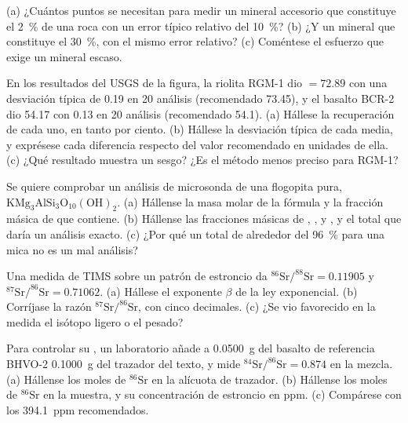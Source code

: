 \begin{exercise}[$\star\star$]\label{exo:b2:field-lab-methods-2:5}
(a) ¿Cuántos puntos se necesitan para medir un mineral accesorio que constituye el \qty{2}{\percent} de una roca
con un error típico relativo del \qty{10}{\percent}? (b) ¿Y un mineral que constituye el \qty{30}{\percent},
con el mismo error relativo? (c) Coméntese el esfuerzo que exige un mineral escaso.
\end{exercise}

\begin{exercise}[$\star\star$]\label{exo:b2:field-lab-methods-2:6}
En los resultados del USGS de la figura, la riolita RGM-1 dio  $= 72.89$ con una desviación
típica de 0.19 en 20 análisis (recomendado 73.45), y el basalto BCR-2 dio 54.17 con 0.13 en
20 análisis (recomendado 54.1). (a) Hállese la recuperación de cada uno, en tanto por ciento. (b) Hállese la desviación
típica de cada media, y exprésese cada diferencia respecto del valor recomendado en unidades de ella.
(c) ¿Qué resultado muestra un sesgo? ¿Es el método menos preciso para RGM-1?
\end{exercise}

\begin{exercise}[$\star\star$]\label{exo:b2:field-lab-methods-2:7}
Se quiere comprobar un análisis de microsonda de una flogopita pura, $\mathrm{KMg_3AlSi_3O_{10}(OH)_2}$.
(a) Hállense la masa molar de la fórmula y la fracción másica de  que contiene. (b) Hállense las
fracciones másicas de , ,  y , y el total que daría un análisis
exacto. (c) ¿Por qué un total de alrededor del \qty{96}{\percent} para una mica no es un mal análisis?
\end{exercise}

\begin{exercise}[$\star\star$]\label{exo:b2:field-lab-methods-2:8}
Una medida de TIMS sobre un patrón de estroncio da $^{86}\mathrm{Sr}/^{88}\mathrm{Sr} = 0.11905$ y
$^{87}\mathrm{Sr}/^{86}\mathrm{Sr} = 0.71062$. (a) Hállese el exponente $\beta$ de la ley exponencial.
(b) Corríjase la razón $^{87}\mathrm{Sr}/^{86}\mathrm{Sr}$, con cinco decimales. (c) ¿Se vio favorecido en la medida el isótopo
ligero o el pesado?
\end{exercise}

\begin{exercise}[$\star\star$]\label{exo:b2:field-lab-methods-2:9}
Para controlar su , un laboratorio añade a \qty{0.0500}{g} del basalto de referencia BHVO-2
\qty{0.1000}{g} del trazador del texto, y mide $^{84}\mathrm{Sr}/^{86}\mathrm{Sr} =
0.874$ en la mezcla. (a) Hállense los moles de $^{86}\mathrm{Sr}$ en la alícuota de trazador. (b) Hállense los
moles de $^{86}\mathrm{Sr}$ en la muestra, y su concentración de estroncio en ppm. (c) Compárese con
los \qty{394.1}{ppm} recomendados.
\end{exercise}

